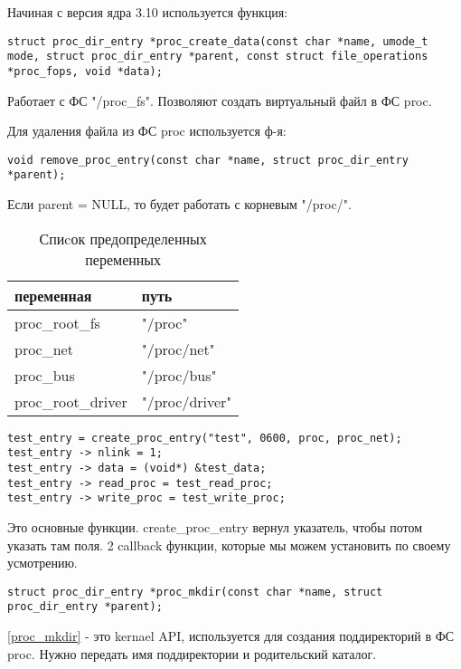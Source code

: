 Начиная с версия ядра 3.10 используется функция: \
\begin{lstlisting}
struct proc_dir_entry *proc_create_data(const char *name, umode_t mode, struct proc_dir_entry *parent, const struct file_operations *proc_fops, void *data);
\end{lstlisting}
Работает с ФС "/proc\_fs". Позволяют создать виртуальный файл в ФС proc. 

Для удаления файла из ФС proc используется ф-я: 
\begin{lstlisting}
void remove_proc_entry(const char *name, struct proc_dir_entry *parent);
\end{lstlisting}
Если parent = NULL, то будет работать с корневым "/proc/".

\begin{table}[H]
\caption{Спиcок предопределенных переменных}
\begin{tabular}{|l|l|}
\hline
переменная & путь \\
\hline
proc\_root\_fs & "/proc" \\
proc\_net & "/proc/net" \\
proc\_bus & "/proc/bus" \\
proc\_root\_driver & "/proc/driver" \\
\hline
\end{tabular}
\end{table}

\begin{lstlisting}[caption=Последовательность действий для инициализации файла "/proc/net/test"]
test_entry = create_proc_entry("test", 0600, proc, proc_net);
test_entry -> nlink = 1;
test_entry -> data = (void*) &test_data;
test_entry -> read_proc = test_read_proc;
test_entry -> write_proc = test_write_proc;
\end{lstlisting}

Это основные функции. create\_proc\_entry  вернул указатель, чтобы потом указать там поля. 2 callback функции, которые мы можем установить по своему усмотрению.

\begin{lstlisting}[label=proc_mkdir, caption=создание поддиректории]
struct proc_dir_entry *proc_mkdir(const char *name, struct proc_dir_entry *parent); 
\end{lstlisting}

\ref{proc_mkdir} - это kernael API, используется для создания поддиректорий в ФС proc. Нужно передать имя поддиректории и родительский каталог.

 

